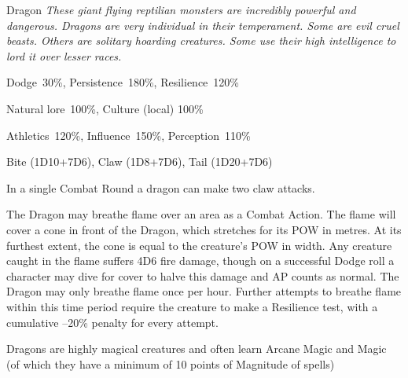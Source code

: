 \begin{monsterbox}{Dragon}
	\textit{These giant flying reptilian monsters are incredibly powerful and dangerous. Dragons are very individual in their temperament. Some are evil cruel beasts. Others are solitary hoarding creatures. Some use their high intelligence to lord it over lesser races.}\\
	\rpghline
	\basics[%
        hitpoints  = 50, %
	majorwound = 25,
	damagemodifier = +7D6,
	powerpoints = 26,
	movementrate = {30m, 45m when flying},
	armor = Dragon Scales (12AP),
	plunderrating = 5-6
	]
	\rpghline%
	\stats[ %
		STR = 20D6    (70),
		CON = 10D6    (35),
		DEX = 4D6     (14),
		SIZ = 10D6+30 (65),
		INT = 6D6     (21),
		POW = 4D6+12  (26),
		CHA = 6D6     (21)
	]
	\rpghline%
	\begin{rpg-monsteraction}[Resistances]
		Dodge~30\%, Persistence~180\%, Resilience~120\%
	\end{rpg-monsteraction}
	\begin{rpg-monsteraction}[Knowledge]
		Natural lore~100\%, Culture (local) 100\%
	\end{rpg-monsteraction}
	\begin{rpg-monsteraction}[Practical]
		Athletics~120\%, Influence~150\%, Perception~110\%
	\end{rpg-monsteraction}
	\begin{rpg-monsteraction}
		Bite (1D10+7D6), Claw (1D8+7D6), Tail (1D20+7D6)
	\end{rpg-monsteraction}
	\begin{rpg-monsteraction}
		In a single Combat Round a dragon can make two claw attacks.
	\end{rpg-monsteraction}
	\begin{rpg-monsteraction}
		The Dragon may breathe flame over an area as a Combat Action. The flame will cover a cone in front of the Dragon, which stretches for its POW in metres. At its furthest extent, the cone is equal to the creature’s POW in width.
		Any creature caught in the flame suffers 4D6 fire damage, though on a successful Dodge roll a character may dive for cover to halve this damage and AP counts as normal.
		The Dragon may only breathe flame once per hour. Further attempts to breathe flame within this time period require the creature to make a Resilience test, with a cumulative –20\% penalty for every attempt.
	\end{rpg-monsteraction}
	\begin{rpg-monsteraction}[Supernatural]
		Dragons are highly magical creatures and often learn Arcane Magic and Magic (of which they have a minimum of 10 points of Magnitude of spells)
	\end{rpg-monsteraction}
\end{monsterbox}

